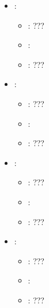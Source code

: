 \begin{itemize}
\begin{itemize}
                \item \optionDescrption{}: ???
           \end{itemize}
    \item {}:
           \begin{itemize}
                \item \optionPossibleValues{}: ???
                \item \optionDefaultValue{}: 
                \item \optionDescrption{}: ???
           \end{itemize}
    \item {}:
           \begin{itemize}
                \item \optionPossibleValues{}: ???
                \item \optionDefaultValue{}: 
                \item \optionDescrption{}: ???
           \end{itemize}
    \item {}:
           \begin{itemize}
                \item \optionPossibleValues{}: ???
                \item \optionDefaultValue{}: 
                \item \optionDescrption{}: ???
           \end{itemize}
    \item {}:
           \begin{itemize}
                \item \optionPossibleValues{}: ???
                \item \optionDefaultValue{}: 
                \item \optionDescrption{}: ???
           \end{itemize}
\end{itemize}




